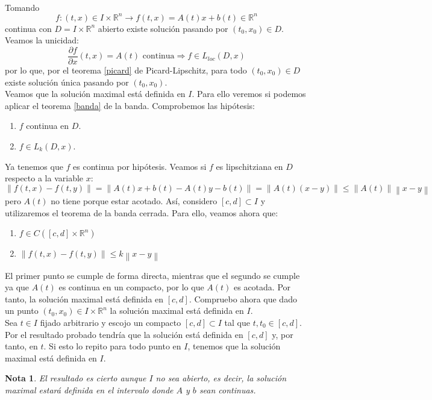 \documentclass[11pt, a4paper,twoside]{article}
\makeatletter
\theoremstyle{theorem-style}  %
\renewenvironment{proof}[1][\proofname]{\par
	\pushQED{\qed}%
	\normalfont \topsep6\p@\@plus6\p@\relax
	\list{}{%
		\settowidth{\leftmargin}{\quad:\hskip\labelsep}%
		\setlength{\labelwidth}{0pt}%
		\setlength{\itemindent}{-\leftmargin}%
	}%
	\item[\hskip\labelsep\itshape#1\@addpunct{:}]\ignorespaces
}{%
	\popQED\endlist\@endpefalse
}
\theoremstyle{definition-style}
\newtheorem*{note}{Nota} %
\theoremstyle{example-style}
\providecommand{\norm}[1]{\left\lVert#1\right\rVert} %
\makeatother
\begin{document}
\begin{proof}\ \\
	Tomando
	\[f:(t, x) \in I \times \mathbb{R}^n \longrightarrow f(t,x)=A(t)x+b(t)\in\mathbb{R}^n\]
	continua con $D = I \times \mathbb{R}^n$ abierto existe solución pasando por $(t_0, x_0) \in D$. Veamos la unicidad:
	\[\frac{\partial f}{\partial x} (t, x) = A(t) \text{ continua} \Rightarrow f \in L_{loc} (D, x)\]
	por lo que, por el teorema \ref{picard} de Picard-Lipschitz, para todo $ (t_0, x_0) \in D$ existe solución única pasando por $(t_0, x_0)$. \\
	Veamos que la solución maximal está definida en $I$. Para ello veremos si podemos aplicar el teorema \ref{banda} de la banda. Comprobemos las hipótesis:
	\begin{enumerate}
		\item $f$ continua en $D$.
		\item $f \in L_k (D, x)$.
	\end{enumerate}
	Ya tenemos que $f$ es continua por hipótesis. Veamos si $f$ es lipschitziana en $D$ respecto a la variable $x$:
	\[\norm{f(t, x) - f(t, y)} = \norm{A(t)x + b(t) - A(t)y - b(t)} = \norm{A(t) (x-y)} \leq \norm{A(t)} \norm{x - y} \]
	pero $A(t)$ no tiene porque estar acotado. Así, considero $[c, d] \subset I$ y utilizaremos el teorema de la banda cerrada. Para ello, veamos ahora que:
	\begin{enumerate}
		\item $f \in C([c, d] \times \mathbb{R}^n)$
		\item $\norm{f(t, x) - f(t, y)} \leq k \norm{x - y}$
	\end{enumerate}
	El primer punto se cumple de forma directa, mientras que el segundo se cumple ya que $A(t)$ es continua en un compacto, por lo que $A(t)$ es acotada. Por tanto, la solución maximal está definida en $[c, d]$. Compruebo ahora que dado un punto $(t_0, x_0) \in I \times \mathbb{R}^n$ la solución maximal está definida en $I$. \\
	Sea $t \in I$ fijado arbitrario y escojo un compacto $[c, d]\subset I$ tal que $t, t_0 \in [c, d]$. \\
	Por el resultado probado tendría que la solución está definida en $[c, d]$ y, por tanto, en $t$. Si esto lo repito para todo punto en $I$, tenemos que la solución maximal está definida en $I$.
\end{proof}
\begin{note}
	El resultado es cierto aunque $I$ no sea abierto, es decir, la solución maximal estará definida en el intervalo donde $A$ y $b$ sean continuas.
\end{note}
\end{document}
